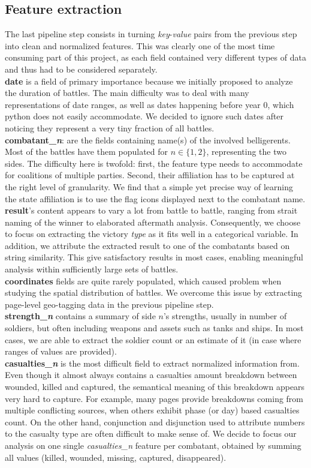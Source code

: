 \subsection{Feature extraction}
The last pipeline step consists in turning \textit{key}-\textit{value} pairs from the previous step into clean and normalized features. This was clearly one of the most time consuming part of this project, as each field contained very different types of data and thus had to be considered separately. \\
\textbf{date} is a field of primary importance because we initially proposed to analyze the duration of battles. The main difficulty was to deal with many representations of date ranges, as well as dates happening before year 0, which python does not easily accommodate. We decided to ignore such dates after noticing they represent a very tiny fraction of all battles.\\
\textbf{combatant\_\textit{n}}: are the fields containing name(s) of the involved belligerents. Most of the battles have them populated for $n \in \{1, 2\}$, representing the two sides. The difficulty here is twofold: first, the feature type needs to accommodate for coalitions of multiple parties. Second, their affiliation has to be captured at the right level of granularity. We find that a simple yet precise way of learning the state affiliation is to use the flag icons displayed next to the combatant name.\\
\textbf{result}'s content appears to vary a lot from battle to battle, ranging from strait naming of the winner to elaborated aftermath analysis. Consequently, we choose to focus on extracting the victory \textit{type} as it fits well in a categorical variable. In addition, we attribute the extracted result to one of the combatants based on string similarity. This give satisfactory results in most cases, enabling meaningful analysis within sufficiently large sets of battles.\\
\textbf{coordinates} fields are quite rarely populated, which caused problem when studying the spatial distribution of battles. We overcome this issue by extracting page-level geo-tagging data in the previous pipeline step.\\
\textbf{strength\_\textit{n}} contains a summary of side $n$'s strengths, usually in number of soldiers, but often including weapons and assets such as tanks and ships. In most cases, we are able to extract the soldier count or an estimate of it (in case where ranges of values are provided).\\
\textbf{casualties\_\textit{n}} is the most difficult field to extract normalized information from. Even though  it almost always contains a casualties amount breakdown between wounded, killed and captured, the semantical meaning of this breakdown appears very hard to capture. For example, many pages provide breakdowns coming from multiple conflicting sources, when others exhibit phase (or day) based casualties count. On the other hand, conjunction and disjunction used to attribute numbers to the casualty type are often difficult to make sense of. We decide to focus our analysis on one single \textit{casualties\_\textit{n}} feature per combatant, obtained by summing all values (killed, wounded, missing, captured, disappeared).